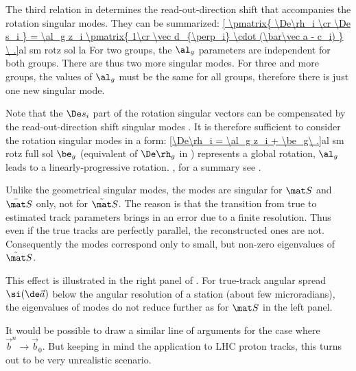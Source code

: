 The third relation in  determines the read-out-direction shift that accompanies the rotation singular modes. They can be summarized:
\eqref{
\pmatrix{
	\De\rh_i \cr
	\De s_i
	}
= \al_g z_i \pmatrix{
	1\cr
	\vec d_{\perp_i} \cdot (\bar\vec a - c_i)
}
\ .}{al sm rotz sol la}
For two groups, the $\al_g$ parameters are independent for both groups. There are thus two more singular modes. For three and more groups, the values of $\al_g$ must be the same for all groups, therefore there is just one new singular mode.

Note that the $\De s_i$ part of the rotation singular vectors  can be compensated by the read-out-direction shift singular modes . It is therefore sufficient to consider the rotation singular modes in a form:
\eqref{\De\rh_i = \al_g z_i + \be_g\ .}{al sm rotz full sol}
$\be_g$ (equivalent of $\De\rh_g$ in ) represents a global rotation, $\al_g$ leads to a linearly-progressive rotation. , for a summary see .

Unlike the geometrical singular modes, the modes  are singular for $\mat S$ and $\bar\mat S$ only, not for $\tilde\mat S$. The reason is that the transition  from true to estimated track parameters brings in an error due to a finite resolution. Thus even if the true tracks are perfectly parallel, the reconstructed ones are not. Consequently the modes  correspond only to small, but non-zero eigenvalues of $\tilde\mat S$.

This effect is illustrated in the right panel of . For true-track angular spread $\si(\de\vec a)$ below the angular resolution of a station (about few microradians), the eigenvalues of modes  do not reduce further as for $\mat S$ in the left panel.

It would be possible to draw a similar line of arguments for the case where $\vec b^n\to \vec b_0$. But keeping in mind the application to LHC proton tracks, this turns out to be very unrealistic scenario.



